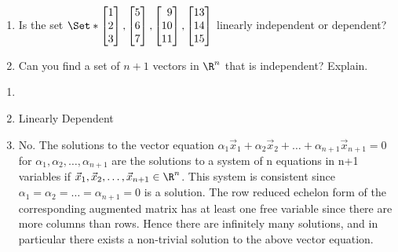 \begin{exercises}
\begin{problist}
\begin{enumerate}
			\item Is the set $\Set*{\mat{1\\2\\3},\mat{5\\6\\7},
				\mat{9\\10\\11}, \mat{13\\14\\15}}$ linearly
				independent or dependent?

			\item Can you find a set of $n+1$ vectors in $\R^{n}$ that is independent? Explain.
		\end{enumerate}
		\begin{solution}
		    	\begin{enumerate}
				\item
				\item Linearly Dependent
				\item No. The solutions to the vector equation
				$\alpha_{1}\vec{x}_{1}+\alpha_{2}\vec{x}_{2}+\ldots+\alpha_{n+1}\vec{x}_{n+1}=0$
				for $\alpha_{1},\alpha_{2},\ldots,\alpha_{n+1}$
				are the solutions to a system of n equations
				in n+1 variables if $\vec {x}_{1},\vec {x}_{2},\ldots,\vec {x}_{n+1}\in
				\R^n$. This system is consistent
				since
				$\alpha_{1}=\alpha_{2}=\ldots=\alpha_{n+1}=0$
				is a solution. The row reduced echelon form
				of the corresponding augmented matrix has at
				least one free variable since there are more
				columns than rows. Hence there are
				infinitely many solutions, and in particular
				there exists a non-trivial solution to the
				above vector equation.
		    	\end{enumerate}
		\end{solution}
		

\end{problist}
\end{exercises}
